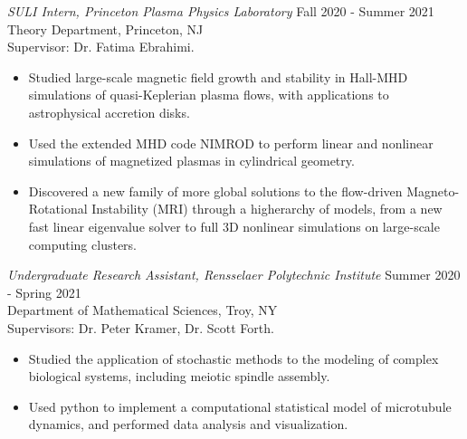 \documentclass{rpires}
\begin{document}
\begin{resume}
\textit{SULI Intern, Princeton Plasma Physics Laboratory} \hfill Fall 2020 - Summer 2021 \\
Theory Department, Princeton, NJ \\
Supervisor: Dr. Fatima Ebrahimi.
\begin{itemize}
  \item {Studied large-scale magnetic field growth and stability in Hall-MHD simulations of quasi-Keplerian plasma flows, with applications to astrophysical accretion disks.}
  \item {Used the extended MHD code NIMROD to perform linear and nonlinear simulations of magnetized plasmas in cylindrical geometry.}
  \item {Discovered a new family of more global solutions to the flow-driven Magneto-Rotational Instability (MRI) through a higherarchy of models, from a new fast linear eigenvalue solver to full 3D nonlinear simulations on large-scale computing clusters.}
\end{itemize}

\textit{Undergraduate Research Assistant, Rensselaer Polytechnic Institute} \hfill Summer 2020 - Spring 2021 \\
Department of Mathematical Sciences, Troy, NY \\
Supervisors: Dr. Peter Kramer, Dr. Scott Forth.
\begin{itemize}
  \item {Studied the application of stochastic methods to the modeling of complex biological systems, including meiotic spindle assembly.}
  \item {Used python to implement a computational statistical model of microtubule dynamics, and performed data analysis and visualization.}
\end{itemize}


\end{resume}
\end{document}
